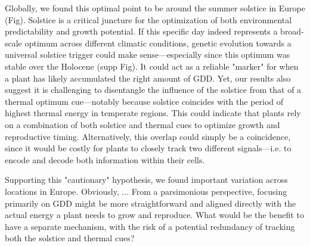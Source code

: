\documentclass[11pt,letter]{article}
\begin{document}
Globally, we found this optimal point to be around the summer solstice in Europe (Fig). Solstice is a critical juncture for the optimization of both environmental predictability and growth potential.
If this specific day indeed represents a broad-scale optimum across different climatic conditions, genetic evolution towards a universal solstice trigger could make sense---especially since this optimum was stable over the Holocene (supp Fig). 
It could act as a reliable "marker" for when a plant has likely accumulated the right amount of GDD.
Yet, our results also suggest it is challenging to disentangle the influence of the solstice from that of a thermal optimum cue---notably because solstice coincides with the period of highest thermal energy in temperate regions.
This could indicate that plants rely on a combination of both solstice and thermal cues to optimize growth and reproductive timing. 
Alternatively, this overlap could simply be a coincidence, since it would be costly for plants to closely track two different signals---i.e. to encode and decode both information within their cells. 

Supporting this "cautionary" hypothesis, we found important variation across locations in Europe. Obviously, ...
From a parsimonious perspective, focusing primarily on GDD might be more straightforward and aligned directly with the actual energy a plant needs to grow and reproduce. 
What would be the benefit to have a separate mechanism, with the risk of a potential redundancy of tracking both the solstice and thermal cues?
\end{document}
